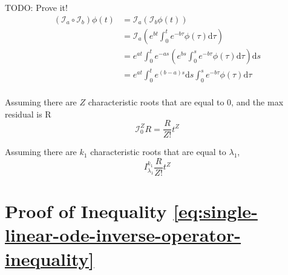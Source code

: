 \documentclass{article}
\newcommand{\I}{\mathcal{I}}
\begin{document}
    TODO: Prove it!
    \begin{align}
        \left(\I_a \circ \I_b\right) \phi (t) &= \I_a \left(\I_b \phi(t) \right) \\
        &= \I_a \left(e^{bt} \int_{0}^{t} e^{-b\tau} \phi(\tau) \mathrm{d} \tau\right) \\
        &= e^{at}\int_{0}^{t}e^{-as} \left(e^{bs} \int_{0}^{s} e^{-b\tau} \phi(\tau) \mathrm{d} \tau\right)\mathrm{d}s \\
        &= e^{at}\int_{0}^{t}e^{(b-a)s} \mathrm{d}s \int_{0}^{s} e^{-b\tau} \phi(\tau) \mathrm{d} \tau \\
    \end{align}

    Assuming there  are $Z$ characteristic roots that are equal to $0$, and the max residual is R
    \begin{equation}
        \I_0^Z R = \frac{R}{Z!} t^Z
    \end{equation}

    Assuming there are $k_1$ characteristic roots that are equal to $\lambda_{1}$,
    \begin{equation}
        I_{\lambda_1}^{k_1} \frac{R}{Z!} t^Z
    \end{equation}

\section{Proof of Inequality \ref{eq:single-linear-ode-inverse-operator-inequality}} \label{appendix:inequality-proof-inverse-operator-chain}
\end{document}
